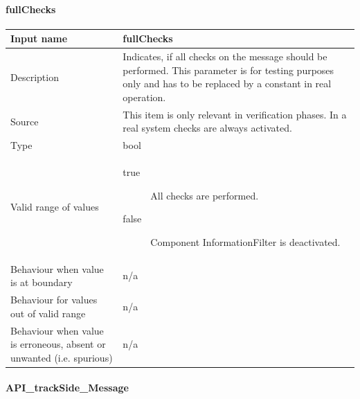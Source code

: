 \paragraph{fullChecks}

\begin{longtable}{p{}p{}}
\toprule
Input name				& fullChecks \\
\midrule
Description				& Indicates, if all checks on the message should be performed. This parameter is for testing purposes only and has to be replaced by a constant in real operation.\\
\midrule
Source					& This item is only relevant in verification phases. In a real system checks are always activated. \\ 
\midrule
Type					& bool \\
\midrule
Valid range of values	& 
\begin{description}
\item[true] All checks are performed.
\item[false] Component InformationFilter is deactivated.
\end{description} \\
\midrule
Behaviour when value is at boundary	& n/a \\
\midrule
Behaviour for values out of valid range	& n/a \\
\midrule
Behaviour when value is erroneous, absent or unwanted (i.e. spurious) & n/a\\
\bottomrule
\end{longtable}


\paragraph{API\_trackSide\_Message}

